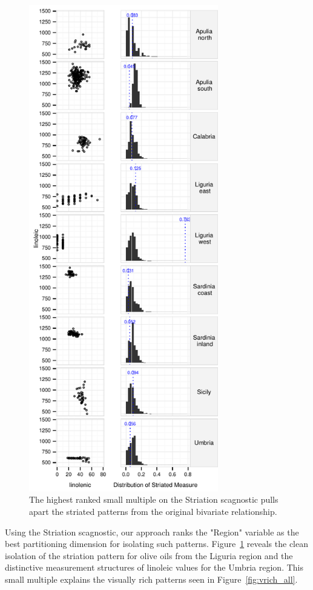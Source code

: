 \begin{figure}
	\includegraphics[width=3.25in]{images/15_729035813077-region.pdf}
	  \caption{The highest ranked small multiple on the Striation scagnostic pulls apart the striated patterns from the original bivariate relationship. }
	 \label{fig:vrich_sm}
\end{figure}

Using the Striation scagnostic, our approach ranks the "Region" variable as the best partitioning dimension for isolating such patterns. Figure~\ref{fig:vrich_sm} reveals the clean isolation of the striation pattern for olive oils from the Liguria region and the distinctive measurement structures of linoleic values for the Umbria region. This small multiple explains the visually rich patterns seen in Figure~\ref{fig:vrich_all}.

